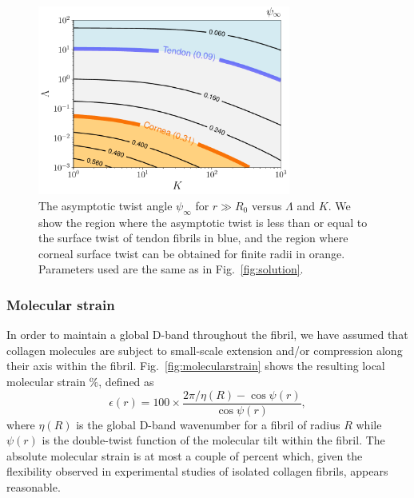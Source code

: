 \documentclass[twoside,twocolumn,9pt]{article}
\begin{document}
\begin{figure}[t] 
\centering
  \includegraphics[width=8.3cm]{figure3.pdf}
  \caption{The asymptotic twist angle $\psi_\infty$ for $r \gg R_0$ versus $\Lambda$ and $K$. We show the region where the asymptotic twist is less than or equal to the surface twist of tendon fibrils in blue, and the region where corneal surface twist can be obtained for finite radii in orange. Parameters used are the same as in Fig.~\ref{fig:solution}.}
  \label{fig:asymptotictwist}
\end{figure}

\subsubsection{Molecular strain}
In order to maintain a global D-band throughout the fibril, we have assumed that collagen molecules are subject to small-scale extension and/or compression along their axis within the fibril. Fig.~\ref{fig:molecularstrain} shows the resulting local molecular strain $\%$, defined as \cite{Cameron:2020}
\begin{equation}
    \epsilon(r) = 100\times \frac{2\pi/\eta(R)-\cos\psi(r)}{\cos\psi(r)},
\end{equation}
where $\eta(R)$ is the global D-band wavenumber for a fibril of radius $R$ while $\psi(r)$ is the double-twist function of the molecular tilt within the fibril. The absolute molecular strain is at most a couple of percent which, given the flexibility observed in experimental studies of isolated collagen fibrils,\cite{Rezaei:2018} appears reasonable.
\end{document}
